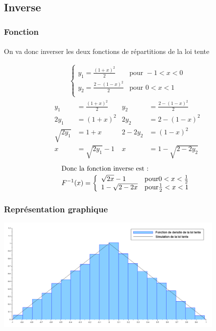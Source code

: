 \documentclass{article}
\begin{document}
\paragraph{}

\subsection{Inverse}

\subsubsection{Fonction}
\paragraph{} On va donc inverser les deux fonctions de répartitions de la loi tente%

\begin{align}
\left\{
	\begin{array}{ll}
		y_1=\frac{(1+x)^2}{2} &\mbox{pour } -1<x<0\\
		y_2=\frac{2-(1-x)^2}{2} &\mbox{pour } 0<x<1\\
	\end{array}
\right.
\end{align}
\begin{align}
y_1 & =\frac{(1+x)^2}{2} & y_2 & = \frac{2-(1-x)^2}{2} \\
2y_1 & = (1+x)^2 & 2y_2 & = 2 - (1-x)^2 \\
\sqrt{2y_1} & = 1+x & 2-2y_2 & = (1-x)^2 \\
x & = \sqrt{2y_1} - 1 & x & = 1- \sqrt{ 2-2y_2}
\end{align}
\begin{align}
\intertext{Donc la fonction inverse est :}
F^{-1}(x)=\left\{
		\begin{array}{ll}
			\sqrt{2x}-1 & \mbox{pour} 0<x<\frac{1}{2} \\
			1-\sqrt{2-2x} & \mbox{pour} \frac{1}{2}<x<1
		\end{array}
\right.
\end{align}


\subsubsection{Représentation graphique}
\begin{center}
\includegraphics[width=425px]{img/tente_inversion.png}
\end{center}
\end{document}
